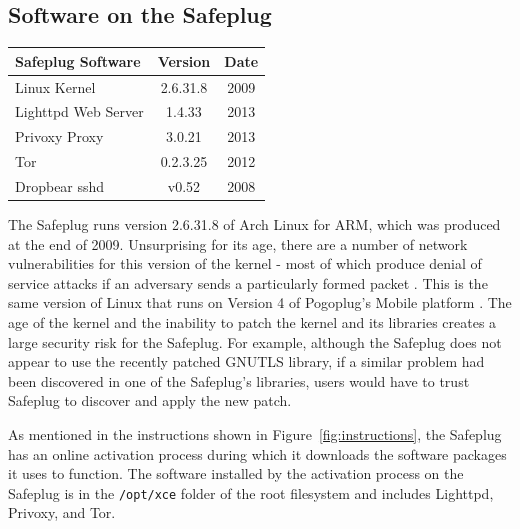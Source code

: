 \documentclass[conference]{IEEEtran}
\begin{document}
\subsection{Software on the Safeplug}
\label{versions}
\begin{center}
  \begin{tabular}{|l|c|c|}
    \hline
    Safeplug Software & Version & Date \\ \hline
    Linux Kernel & 2.6.31.8 & 2009 \\ \hline
    Lighttpd Web Server & 1.4.33 & 2013 \\ \hline
    Privoxy Proxy & 3.0.21 & 2013 \\ \hline
    Tor & 0.2.3.25 & 2012 \\ \hline
    Dropbear sshd & v0.52 & 2008 \\ \hline
  \end{tabular}
\end{center}

The Safeplug runs version 2.6.31.8 of Arch Linux for ARM, which was produced at the end of 2009.  Unsurprising for its age, there are a number of network vulnerabilities for this version of the kernel - most of which produce denial of service attacks if an adversary sends a particularly formed packet \cite{kernelcve}.  This is the same version of Linux that runs on Version 4 of Pogoplug's Mobile platform \cite{archforum}.  The age of the kernel and the inability to patch the kernel and its libraries creates a large security risk for the Safeplug.  For example, although the Safeplug does not appear to use the recently patched GNUTLS library, if a similar problem had been discovered in one of the Safeplug's libraries, users would have to trust Safeplug to discover and apply the new patch.

As mentioned in the instructions shown in Figure~\ref{fig:instructions}, the Safeplug has an online activation process during which it downloads the software packages it uses to function.  The software installed by the activation process on the Safeplug is in the \verb!/opt/xce! folder of the root filesystem and includes Lighttpd, Privoxy, and Tor.  
\end{document}
